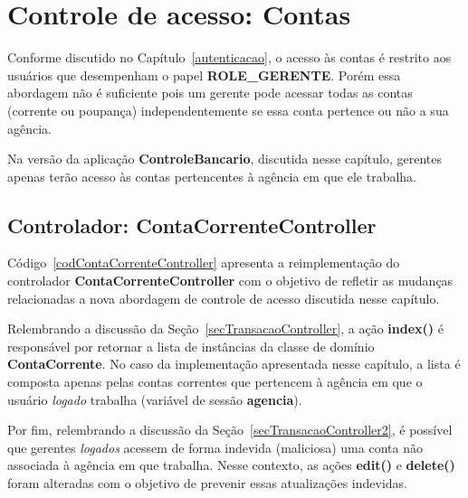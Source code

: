 \section{Controle de acesso: Contas}

\vspace{0.5cm}

Conforme discutido no Capítulo~\ref{autenticacao}, o acesso às contas é restrito
aos usuários que desempenham o  papel {\bf ROLE\_GERENTE}.  Porém essa abordagem
não  é suficiente  pois um  gerente pode  acessar todas  as contas  (corrente ou
poupança) independentemente se essa conta pertence ou não a sua agência.

\vspace{0.2cm}

Na  versão  da  aplicação  {\bf  ControleBancario},  discutida  nesse  capítulo,
gerentes  apenas  terão acesso  às  contas pertencentes  à  agência  em que  ele
trabalha. 

\subsection{Controlador: ContaCorrenteController}

\vspace{0.5cm}

Código~\ref{codContaCorrenteController}    apresenta   a    reimplementação   do
controlador {\bf ContaCorrenteController} com o objetivo de refletir as mudanças
relacionadas a nova abordagem de controle de acesso discutida nesse capítulo.  

\vspace{0.2cm}

Relembrando  a  discussão  da  Seção~\ref{secTransacaoController}, a  ação  {\bf
  index()} é responsável por retornar a lista de instâncias da classe de domínio
{\bf  ContaCorrente}.  No caso  da implementação  apresentada nesse  capítulo, a
lista é composta apenas pelas contas  correntes que pertencem à agência em que o
usuário {\it logado} trabalha (variável de sessão {\bf agencia}). 

\vspace{0.2cm}

Por  fim,  relembrando  a  discussão da  Seção~\ref{secTransacaoController2},  é
possível que  gerentes {\it logados}  acessem de forma indevida  (maliciosa) uma
conta não  associada à agência  em que trabalha.  Nesse contexto, as  ações {\bf
  edit()}  e {\bf delete()}  foram alteradas  com o  objetivo de  prevenir essas
atualizações indevidas.

